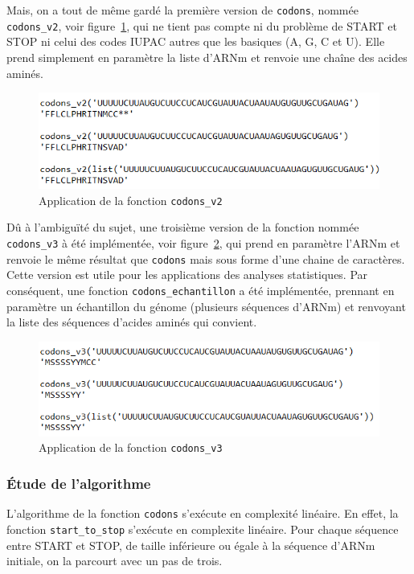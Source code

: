 \documentclass[12pt]{article}
\begin{document}
Mais, on a tout de même gardé la première version de \texttt{codons}, nommée \texttt{codons\_v2}, voir figure~\ref{fig: fctCodonsV2}, qui ne tient pas compte ni du problème de START et STOP ni celui des codes IUPAC autres que les basiques (A, G, C et U). Elle prend simplement en paramètre la liste d'ARNm et renvoie une chaîne des acides aminés. 

     \begin{figure}[!h]
        \centering
        \includegraphics[scale = 1.2]{Images/Codons/app_codons_v2.png}
        \caption{Application de la fonction \texttt{codons\_v2} }
        \label{fig: fctCodonsV2}
    \end{figure}

Dû à l'ambiguïté du sujet, une troisième version de la fonction nommée \texttt{codons\_v3} à été implémentée, voir figure~\ref{fig: fctCodonsV3}, qui prend en paramètre l'ARNm  et renvoie le même résultat que \texttt{codons} mais sous forme d'une chaine de caractères. Cette version est utile pour les applications des analyses statistiques. Par conséquent, une fonction \texttt{codons\_echantillon} a été implémentée, prennant en paramètre un échantillon du génome (plusieurs séquences d'ARNm) et renvoyant la liste des séquences d'acides aminés qui convient.

     \begin{figure}[!h]
        \centering
        \includegraphics[scale = 1.2]{Images/Codons/app_codons_v3.png}
        \caption{Application de la fonction \texttt{codons\_v3} }
        \label{fig: fctCodonsV3}
    \end{figure}



\subsubsection{Étude de l'algorithme}
L'algorithme de la fonction \texttt{codons} s'exécute en complexité linéaire. En effet, la fonction \texttt{start\_to\_stop} s'exécute en complexite linéaire. Pour chaque séquence entre START et STOP, de taille inférieure ou égale à la séquence d'ARNm initiale, on la parcourt avec un pas de trois.
\end{document}
